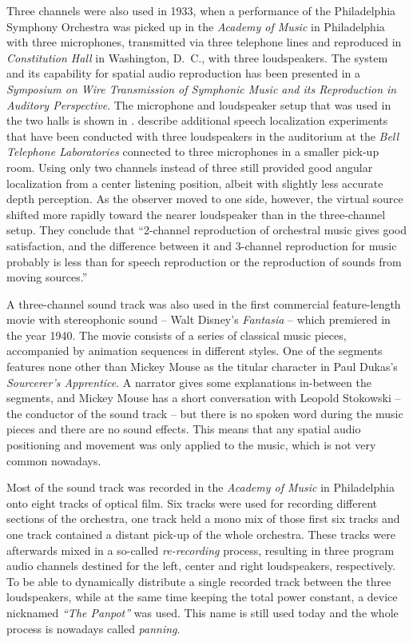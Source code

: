 Three channels were also used in 1933, when a performance of the
Philadelphia Symphony Orchestra
was picked up in the \emph{Academy of Music} in Philadelphia
with three microphones,
transmitted via three telephone lines
and reproduced in \emph{Constitution Hall} in Washington, D.\ C.,
with three loudspeakers.
The system and its capability for spatial audio reproduction
has been presented in a
\emph{Symposium on
Wire Transmission of
Symphonic Music and its
Reproduction in Auditory Perspective}.
The microphone and loudspeaker setup that was used in the two halls is shown in
\parencite{bedell1934auditory}.
\textcite{steinberg1934auditory} describe
additional speech localization experiments that have been conducted
with three loudspeakers
in the auditorium at the \emph{Bell Telephone Laboratories}
connected to three microphones in a smaller pick-up room.
Using only two channels instead of three still provided
good angular localization from a center listening position, albeit
with slightly less accurate depth perception.
As the observer moved to one side, however,
the virtual source shifted more rapidly toward the nearer loudspeaker
than in the three-channel setup.
They conclude that ``2-channel
reproduction of orchestral music gives good satisfaction, and the
difference between it and 3-channel reproduction for music probably
is less than for speech reproduction or the reproduction of sounds
from moving sources.''

A three-channel sound track was also used
in the first commercial feature-length movie with stereophonic sound
-- Walt Disney's \emph{Fantasia} -- which premiered in the year 1940.
The movie consists of
a series of classical music pieces, accompanied by animation sequences in
different styles.
One of the segments
features none other than Mickey Mouse
as the titular character in Paul Dukas's
\emph{Sourcerer's Apprentice}.
A narrator gives some explanations
in-between the segments,
and Mickey Mouse has a short conversation with Leopold Stokowski --
the conductor of the sound track --
but there is no spoken word during the music pieces
and there are no sound effects.
This means that any spatial audio positioning and movement
was only applied to the music,
which is not very common nowadays.

Most of the sound track was recorded in the
\emph{Academy of Music} in Philadelphia
onto
eight tracks of optical film.
Six tracks were used for recording different sections of the orchestra,
one track held a mono mix of those first six tracks
and one track contained a distant pick-up of the whole orchestra.
These tracks were afterwards mixed in a so-called
\emph{re-recording} process, resulting in three program audio channels
destined for the left, center and right loudspeakers, respectively.
To be able to dynamically distribute a single recorded track
between the three loudspeakers,
while at the same time keeping the total power constant,
a device nicknamed \emph{``The Panpot''} was used.
This name is still used today
and the whole process is nowadays called \emph{panning}.

